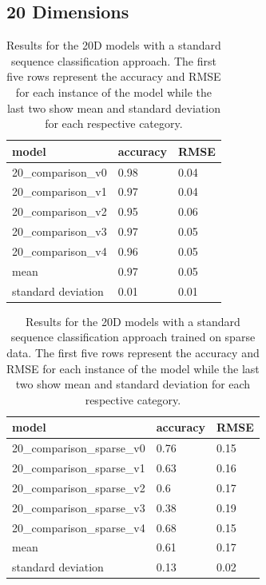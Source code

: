 \subsection{20 Dimensions}


\begin{table}[!htb]
	\centering
	\caption{Results for the 20D models with a standard sequence classification approach. The first five rows represent the accuracy and RMSE for each instance of the model while the last two show mean and standard deviation for each respective category.}
	\begin{tabularx}{\textwidth}{ X  X  X }
		\hline
		model & accuracy & RMSE \\ 
		\hline
		20\_comparison\_v0 & 0.98 & 0.04\\ 
		20\_comparison\_v1 & 0.97 & 0.04 \\
		20\_comparison\_v2 & 0.95 & 0.06 \\ 
		20\_comparison\_v3 & 0.97 & 0.05 \\ 
		20\_comparison\_v4 & 0.96 & 0.05 \\ \hline
		mean & 0.97 & 0.05\\
		standard deviation & 0.01 & 0.01\\
		\hline
	\end{tabularx}
	\label{table:20_comparison_mse}
\end{table}


\begin{table}[!htb]
	\centering
	\caption{Results for the 20D models with a standard sequence classification approach trained on sparse data. The first five rows represent the accuracy and RMSE for each instance of the model while the last two show mean and standard deviation for each respective category.}
	\begin{tabularx}{\textwidth}{ X  X  X }
		\hline
		model & accuracy & RMSE \\ 
		\hline
		20\_comparison\_sparse\_v0 & 0.76 & 0.15\\ 
		20\_comparison\_sparse\_v1 & 0.63 & 0.16 \\
		20\_comparison\_sparse\_v2 & 0.6  & 0.17 \\ 
		20\_comparison\_sparse\_v3 & 0.38 & 0.19 \\ 
		20\_comparison\_sparse\_v4 & 0.68 & 0.15 \\ \hline
		mean & 0.61 & 0.17\\
		standard deviation & 0.13 & 0.02\\
		\hline
	\end{tabularx}
	\label{table:20_comparison_sparse}
\end{table}

